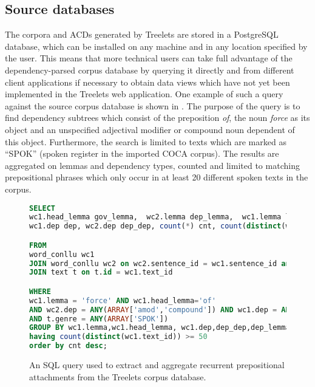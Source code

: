 \documentclass[output=paper]{langscibook}
\begin{document}
\subsection{Source databases}

The corpora and ACDs generated by Treelets are stored in a PostgreSQL database, which can be installed on any machine and in any location specified by the user. This means that more technical users can take full advantage of the dependency-parsed corpus database by querying it directly and from different client applications if necessary to obtain data views which have not yet been implemented in the Treelets web application. One example of such a query against the source corpus database is shown in . The purpose of the query is to find dependency subtrees which consist of the preposition \textit{of}, the noun \textit{force} as its object and an unspecified adjectival modifier or compound noun dependent of this object. Furthermore, the search is limited to texts which are marked as ``SPOK'' (spoken register in the imported COCA corpus). The results are aggregated on lemmas and dependency types, counted and limited to matching prepositional phrases which only occur in at least 20 different spoken texts in the corpus.

\begin{figure}[p]
\begin{lstlisting}[language=SQL,frame=lines]
SELECT
wc1.head_lemma gov_lemma,  wc2.lemma dep_lemma,  wc1.lemma lemma, 
wc1.dep dep, wc2.dep dep_dep, count(*) cnt, count(distinct(wc1.text_id)) texts

FROM
word_conllu wc1
JOIN word_conllu wc2 on wc2.sentence_id = wc1.sentence_id and wc2.head_id = wc1.id
JOIN text t on t.id = wc1.text_id

WHERE
wc1.lemma = 'force' AND wc1.head_lemma='of'
AND wc2.dep = ANY(ARRAY['amod','compound']) AND wc1.dep = ANY(ARRAY['pobj'])
AND t.genre = ANY(ARRAY['SPOK'])
GROUP BY wc1.lemma,wc1.head_lemma, wc1.dep,dep_dep,dep_lemma
having count(distinct(wc1.text_id)) >= 50
order by cnt desc;
\end{lstlisting}
\caption{\label{fig:pezik:12}An SQL query used to extract and aggregate recurrent prepositional attachments from the Treelets corpus database.}
\end{figure}
\end{document}
